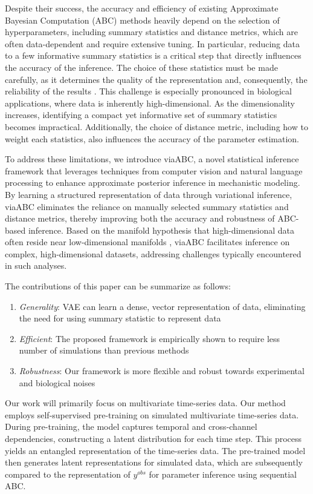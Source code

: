 \documentclass[12pt]{article} %
\begin{document}
Despite their success, the accuracy and efficiency of existing Approximate Bayesian Computation (ABC) methods heavily depend on the selection of hyperparameters, including summary statistics and distance metrics, which are often data-dependent and require extensive tuning. In particular, reducing data to a few informative summary statistics is a critical step that directly influences the accuracy of the inference. The choice of these statistics must be made carefully, as it determines the quality of the representation and, consequently, the reliability of the results \citep{aakesson2021convolutional}. This challenge is especially pronounced in biological applications, where data is inherently high-dimensional. As the dimensionality increases, identifying a compact yet informative set of summary statistics becomes impractical. Additionally, the choice of distance metric, including how to weight each statistics, also influences the accuracy of the parameter estimation.

To address these limitations, we introduce viaABC, a novel statistical inference framework that leverages techniques from computer vision and natural language processing to enhance approximate posterior inference in mechanistic modeling. By learning a structured representation of data through variational inference, viaABC eliminates the reliance on manually selected summary statistics and distance metrics, thereby improving both the accuracy and robustness of ABC-based inference. Based on the manifold hypothesis that high-dimensional data often reside near low-dimensional manifolds \citep{fefferman2016testing}, viaABC facilitates inference on complex, high-dimensional datasets, addressing challenges typically encountered in such analyses. 

The contributions of this paper can be summarize as follows:
\begin{enumerate}
\item \textit{Generality}: VAE can learn a dense, vector representation of data, eliminating the need for using summary statistic to represent data
\item \textit{Efficient}: The proposed framework is empirically shown to require less number of simulations than previous methods
\item \textit{Robustness}: Our framework is more flexible and robust towards experimental and biological noises
\end{enumerate}

Our work will primarily focus on multivariate time-series data. Our method employs self-supervised pre-training on simulated multivariate time-series data. During pre-training, the model captures temporal and cross-channel dependencies, constructing a latent distribution for each time step. This process yields an entangled representation of the time-series data. The pre-trained model then generates latent representations for simulated data, which are subsequently compared to the representation of $y^{obs}$ for parameter inference using sequential ABC.
\end{document}
